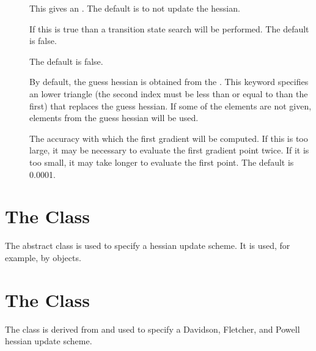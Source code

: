 \begin{description}
  \item[] This gives an 
     .  The default is to not update the
     hessian.

  \item[] If this is true than a transition
     state search will be performed. The default is false.

  \item[] The default is false.

  \item[] By default, the guess hessian is obtained from the
      .  This keyword
     specifies an lower triangle  (the second
     index must be less than or equal to than the first) that replaces the
     guess hessian.  If some of the elements are not given, elements from
     the guess hessian will be used.

  \item[] The accuracy with which the first gradient will
     be computed.  If this is too large, it may be necessary to evaluate
     the first gradient point twice.  If it is too small, it may take
     longer to evaluate the first point. The default is 0.0001.

\end{description}


\section{The  Class}\label{HessianUpdate}

The  abstract class is used to specify a
hessian update scheme.  It is used, for example, by
 objects.


\section{The  Class}\label{DFPUpdate}

The  class is derived from  and
used to specify a Davidson, Fletcher, and Powell hessian update scheme.

